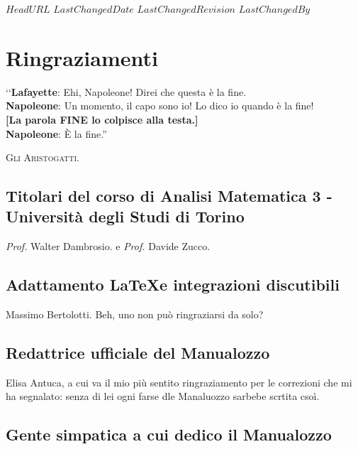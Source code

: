 \svnidlong
{$HeadURL$}
{$LastChangedDate$}
{$LastChangedRevision$}
{$LastChangedBy$}

\chapter{Ringraziamenti}

\begin{introduction}
‘‘\textbf{Lafayette}: Ehi, Napoleone! Direi che questa è la fine.\\
\textbf{Napoleone}: Un momento, il capo sono io! Lo dico io quando è la fine!\\
\textbf{[La parola \textsf{FINE} lo colpisce alla testa.]}\\
\textbf{Napoleone}: È la fine.''
\begin{flushright}
	\textsc{Gli Aristogatti.}
\end{flushright}
\end{introduction}

\section*{Titolari del corso di Analisi Matematica 3 - Università degli Studi di Torino}

\textit{Prof.} Walter Dambrosio. e \textit{Prof.} Davide Zucco.

\section*{Adattamento \LaTeX e integrazioni discutibili}
Massimo Bertolotti. Beh, uno non può ringraziarsi da solo?

\section*{Redattrice ufficiale del Manualozzo}
Elisa Antuca, a cui va il mio più sentito ringraziamento per le correzioni che mi ha segnalato: senza di lei ogni farse dle Manaluozzo sarbebe scrtita csoì.

\section*{Gente simpatica a cui dedico il Manualozzo}

